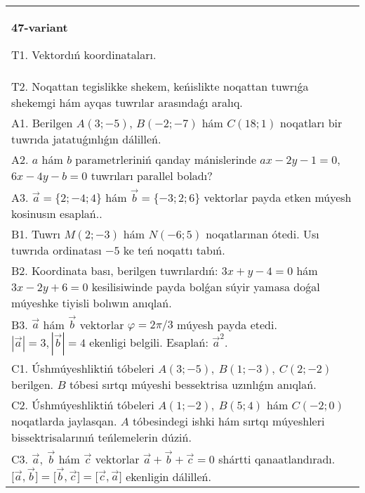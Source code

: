 \documentclass{article}
\begin{document}
\begin{tabular}{m{17cm}}
\textbf{47-variant}
\newline

T1. 
Vektordıń koordinataları.
 \\
T2. 
Noqattan tegislikke shekem, keńislikte noqattan tuwrıǵa shekemgi hám ayqas tuwrılar arasındaǵı aralıq. \\
A1. 
Berilgen $A(3; -5)$, $B(-2; -7)$ hám
$C(18; 1)$ noqatları bir tuwrıda jatatuǵınlıǵın dálilleń.
 \\
A2. 
$a$ hám $b$ parametrleriniń qanday mánislerinde
$ax-2y-1=0$, $6x-4y-b=0$ tuwrıları parallel boladı?
 \\
A3. 
$\overrightarrow{a} = \{ 2; - 4;4\}$ hám $\overrightarrow{b} = \{ - 3;2;6\}$
vektorlar payda etken múyesh kosinusın esaplań.. 
 \\
B1. 
Tuwrı \(M(2;-3)\) hám \(N(-6;5)\) noqatlarınan ótedi.
Usı tuwrıda ordinatası $-5$ ke teń noqattı tabıń.
 \\
B2. 
Koordinata bası, berilgen tuwrılardıń:
\(3x+y-4=0\) hám \(3x-2y+6=0\) kesilisiwinde payda
bolǵan súyir yamasa doǵal múyeshke tiyisli bolıwın anıqlań.
 \\
B3. 
$\vec{a}$ hám $\vec{b}$ vektorlar $\varphi = 2\pi/3$ múyesh payda etedi. $|\vec{a}| = 3,|\vec{b}| = 4$ ekenligi belgili. Esaplań: 
${\vec{a}}^{2}$. 
 \\
C1. 
Úshmúyeshliktiń tóbeleri
\(A(3; - 5),\ B(1; - 3),\ C(2; - 2)\) berilgen. $B$ tóbesi sırtqı
múyeshi bessektrisa uzınlıǵın anıqlań.
 \\
C2. 
Úshmúyeshliktiń tóbeleri \(A(1;-2),\ B(5; 4)\) hám
\(C(-2;0)\) noqatlarda jaylasqan. $A$ tóbesindegi ishki hám sırtqı
múyeshleri bissektrisalarınıń teńlemelerin dúziń.
 \\
C3. 
\(\vec{a},\ \vec{b}\) hám \(\vec{c}\) vektorlar \(\vec{a} + \vec{b} + \vec{c} = 0\) shártti qanaatlandıradı. \(\lbrack\vec{a},\vec{b}\rbrack = \lbrack\vec{b},\vec{c}\rbrack = \lbrack\vec{c},\vec{a}\rbrack\) ekenligin dálilleń.
 \\

\end{tabular}
\vspace{1cm}
\end{document}

